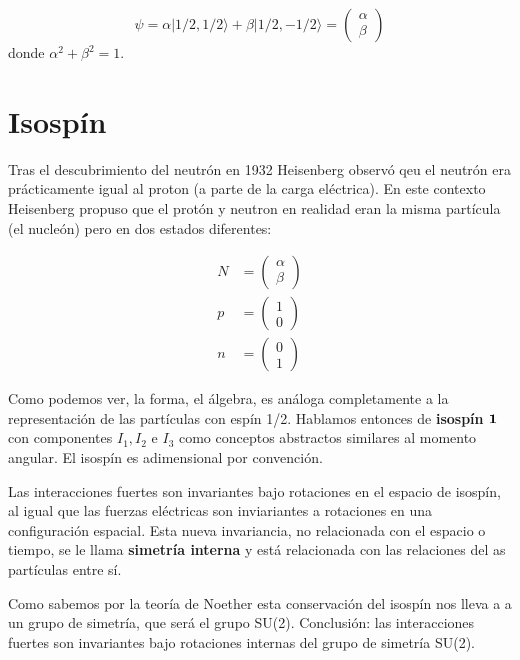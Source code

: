 \begin{equation}
    \psi = \alpha 
    |1/2,1/2 \rangle  + \beta 
    |1/2,-1/2 \rangle   = \begin{pmatrix}
        \alpha \\ 
        \beta
    \end{pmatrix}
\end{equation}
donde $\alpha^2 + \beta^2 = 1$. 

\section{Isospín}

Tras el descubrimiento del neutrón en 1932 Heisenberg observó qeu el neutrón era prácticamente igual al proton (a parte de la carga eléctrica). En este contexto Heisenberg propuso que el protón y neutron en realidad eran la misma partícula  (el nucleón) pero en dos estados diferentes:

\begin{align}
    N &= \begin{pmatrix} \alpha \\ \beta \end{pmatrix} \nonumber \\
    p &= \begin{pmatrix} 1 \\ 0 \end{pmatrix} \nonumber \\
    n &= \begin{pmatrix} 0 \\ 1 \end{pmatrix}
\end{align}

Como podemos ver, la forma, el álgebra, es análoga completamente a la representación de las partículas con espín 1/2. Hablamos entonces de \textbf{isospín} $\mathbf{1}$ con componentes $I_1,I_2$ e $I_3$ como conceptos abstractos similares al momento angular. El isospín es adimensional por convención.

Las interacciones fuertes son invariantes bajo rotaciones en el espacio de isospín, al igual que las fuerzas eléctricas son inviariantes a rotaciones en una configuración espacial. Esta nueva invariancia, no relacionada con el espacio o tiempo, se le llama \textbf{simetría interna} y está relacionada con las relaciones del as partículas entre sí. 

Como sabemos por la teoría de Noether esta conservación del isospín nos lleva a a un grupo de simetría, que será el grupo SU(2). Conclusión: las interacciones fuertes son invariantes bajo rotaciones internas del grupo de simetría SU(2).

